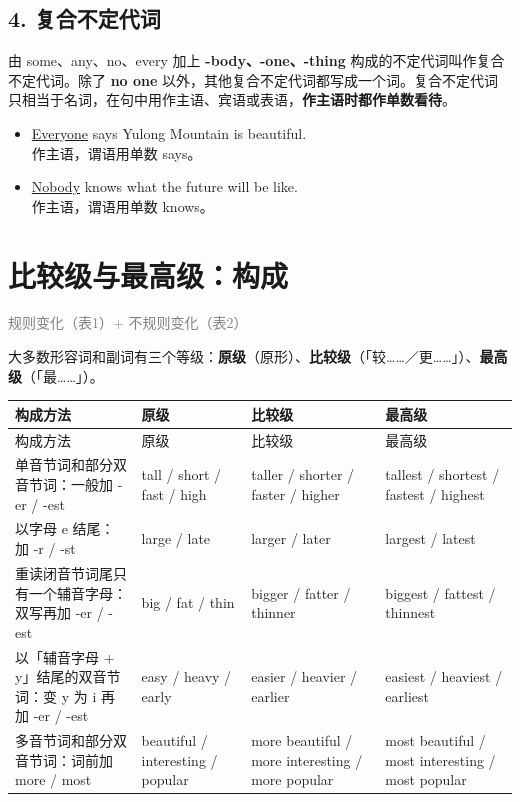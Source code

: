 \documentclass[11pt,a4paper]{ctexart}
\begin{document}
\subsection*{4. 复合不定代词}

由 some、any、no、every 加上 \textbf{-body、-one、-thing} 构成的不定代词叫作复合不定代词。除了 \textbf{no one} 以外，其他复合不定代词都写成一个词。复合不定代词只相当于名词，在句中用作主语、宾语或表语，\textbf{作主语时都作单数看待}。

\begin{itemize}[leftmargin=1.4em]
\item \underline{Everyone} says Yulong Mountain is beautiful.\\ 作主语，谓语用单数 says。
\item \underline{Nobody} knows what the future will be like.\\ 作主语，谓语用单数 knows。
\end{itemize}

\begin{center}\end{center}

\section{比较级与最高级：构成}
\noindent\textcolor{gray}{规则变化（表1）+ 不规则变化（表2）}\par\smallskip
大多数形容词和副词有三个等级：\textbf{原级}（原形）、\textbf{比较级}（「较……／更……」）、\textbf{最高级}（「最……」）。

{\footnotesize
\begin{longtable}{p{3.35cm}p{3.35cm}p{3.35cm}p{3.35cm}}
\hline
构成方法 & 原级 & 比较级 & 最高级 \\
\hline
\endfirsthead
\hline
构成方法 & 原级 & 比较级 & 最高级 \\
\hline
\endhead
\hline
\endfoot
单音节词和部分双音节词：一般加 -er / -est & tall / short / fast / high & taller / shorter / faster / higher & tallest / shortest / fastest / highest \\
以字母 e 结尾：加 -r / -st & large / late & larger / later & largest / latest \\
重读闭音节词尾只有一个辅音字母：双写再加 -er / -est & big / fat / thin & bigger / fatter / thinner & biggest / fattest / thinnest \\
以「辅音字母 + y」结尾的双音节词：变 y 为 i 再加 -er / -est & easy / heavy / early & easier / heavier / earlier & easiest / heaviest / earliest \\
多音节词和部分双音节词：词前加 more / most & beautiful / interesting / popular & more beautiful / more interesting / more popular & most beautiful / most interesting / most popular \\
\end{longtable}
}
\end{document}
